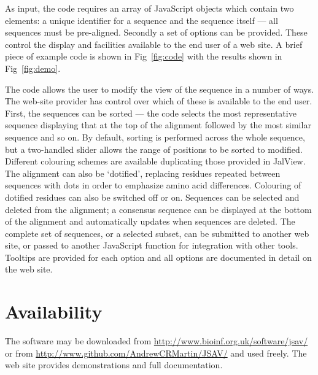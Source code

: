 \documentclass[a4]{bioinfo}
\begin{document}
As input, the code requires an array of JavaScript objects which
contain two elements: a unique identifier for a sequence and the
sequence itself --- all sequences must be pre-aligned.  Secondly a set
of options can be provided. These control the display and facilities
available to the end user of a web site.  A brief piece of example
code is shown in Fig~\ref{fig:code} with the results shown in
Fig~\ref{fig:demo}. 

The code allows the user to modify the view of the sequence in a
number of ways. The web-site provider has control over which of these
is available to the end user. First, the sequences can be sorted ---
the code selects the most representative sequence displaying that at
the top of the alignment followed by the most similar sequence and so
on. By default, sorting is performed across the whole sequence, but a
two-handled slider allows the range of positions to be sorted to
modified. Different colouring schemes are available duplicating those
provided in JalView. The alignment can also be `dotified', replacing
residues repeated between sequences with dots in order to emphasize
amino acid differences. Colouring of dotified residues can also be
switched off or on. Sequences can be selected and deleted from the
alignment; a consensus sequence can be displayed at the bottom of the
alignment and automatically updates when sequences are deleted. The
complete set of sequences, or a selected subset, can be submitted to
another web site, or passed to another JavaScript function for
integration with other tools. Tooltips are provided for each option
and all options are documented in detail on the web site.

\section{Availability}
The software may be downloaded from
\url{http://www.bioinf.org.uk/software/jsav/} or from
\url{http://www.github.com/AndrewCRMartin/JSAV/} and used freely. The
web site provides demonstrations and full documentation. 


\end{document}
